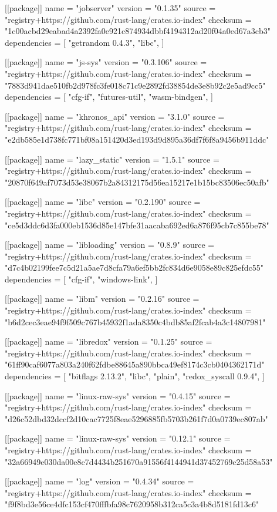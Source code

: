 [[package]]
name = "jobserver"
version = "0.1.35"
source = "registry+https://github.com/rust-lang/crates.io-index"
checksum = "1c00acbd29eabad4a2392fa0e921c874934dbbf4194312ad20f04a0ed67a3cb3"
dependencies = [
 "getrandom 0.4.3",
 "libc",
]

[[package]]
name = "js-sys"
version = "0.3.106"
source = "registry+https://github.com/rust-lang/crates.io-index"
checksum = "7883d941dae510fb2d978fc3fe018c71c9e2892fd38854de3e8b92c2e5ad9cc5"
dependencies = [
 "cfg-if",
 "futures-util",
 "wasm-bindgen",
]

[[package]]
name = "khronos_api"
version = "3.1.0"
source = "registry+https://github.com/rust-lang/crates.io-index"
checksum = "e2db585e1d738fc771bf08a151420d3ed193d9d895a36df7f6f8a9456b911ddc"

[[package]]
name = "lazy_static"
version = "1.5.1"
source = "registry+https://github.com/rust-lang/crates.io-index"
checksum = "20870f649af7073d53e38067b2a84312175d56ea15217e1b15bc83506ec50afb"

[[package]]
name = "libc"
version = "0.2.190"
source = "registry+https://github.com/rust-lang/crates.io-index"
checksum = "ce5d3ddc6d3fa000eb1536d85e147bfe31aacaba692ed6a876f95cb7c855be78"

[[package]]
name = "libloading"
version = "0.8.9"
source = "registry+https://github.com/rust-lang/crates.io-index"
checksum = "d7c4b02199fee7c5d21a5ae7d8cfa79a6ef5bb2fc834d6e9058e89c825efdc55"
dependencies = [
 "cfg-if",
 "windows-link",
]

[[package]]
name = "libm"
version = "0.2.16"
source = "registry+https://github.com/rust-lang/crates.io-index"
checksum = "b6d2cec3eae94f9f509c767b45932f1ada8350c4bdb85af2fcab4a3c14807981"

[[package]]
name = "libredox"
version = "0.1.25"
source = "registry+https://github.com/rust-lang/crates.io-index"
checksum = "61ff90caf6077a803a240f62fdbe88645a890bbca49ef8174c3cb0404362171d"
dependencies = [
 "bitflags 2.13.2",
 "libc",
 "plain",
 "redox_syscall 0.9.4",
]

[[package]]
name = "linux-raw-sys"
version = "0.4.15"
source = "registry+https://github.com/rust-lang/crates.io-index"
checksum = "d26c52dbd32dccf2d10cac7725f8eae5296885fb5703b261f7d0a0739ec807ab"

[[package]]
name = "linux-raw-sys"
version = "0.12.1"
source = "registry+https://github.com/rust-lang/crates.io-index"
checksum = "32a66949e030da00e8c7d4434b251670a91556f4144941d37452769c25d58a53"

[[package]]
name = "log"
version = "0.4.34"
source = "registry+https://github.com/rust-lang/crates.io-index"
checksum = "f9f8bd3e56ce4dfc153cf470fffbfa98c7620958b312ca5c3a4b8d5181fd13c6"

